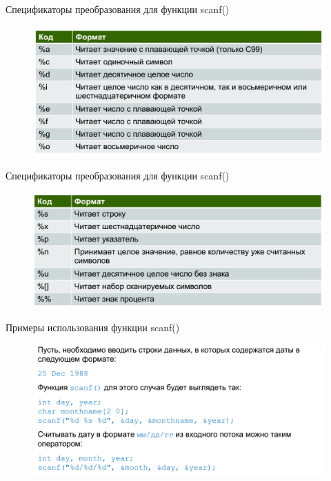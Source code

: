 \documentclass{beamer}
\begin{document}
\begin{frame}{Спецификаторы преобразования для функции scanf()}
\begin{figure}[h]
\centering
\includegraphics[scale=0.4]{images/lec02-pic34.png}
\end{figure}
\end{frame}

\begin{frame}{Спецификаторы преобразования для функции scanf()}
\begin{figure}[h]
\centering
\includegraphics[scale=0.4]{images/lec02-pic35.png}
\end{figure}
\end{frame}

\begin{frame}{Примеры использования функции scanf()}
\begin{figure}[h]
\centering
\includegraphics[scale=0.4]{images/lec02-pic36.png}
\end{figure}
\end{frame}
\end{document}
